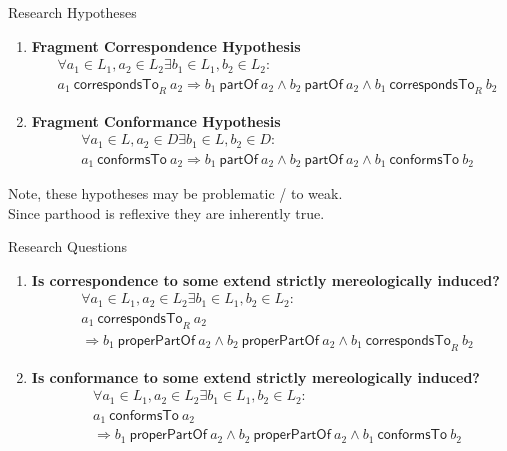 \documentclass{beamer}
\newcommand{\partOf}{~\textsf{partOf}~}
\newcommand{\properPartOf}{~\textsf{properPartOf}~}
\newcommand{\correspondsToR}[1]{~\textsf{correspondsTo}_{#1}~}
\newcommand{\conformsTo}{~\textsf{conformsTo}~}
\begin{document}
\begin{frame}{Research Hypotheses}
\begin{enumerate}[RH1]
\item
\textbf{Fragment Correspondence Hypothesis}
{\scriptsize
\begin{align*}
&\forall a_1 \in L_1, a_2 \in L_2 \exists b_1 \in L_1, b_2 \in L_2 :  
\\&a_1 \correspondsToR{R} a_2
\Rightarrow 
b_1 \partOf a_2 
\wedge b_2 \partOf a_2
\wedge b_1 \correspondsToR{R} b_2
\end{align*}
}
\item
\textbf{Fragment Conformance Hypothesis}
{\scriptsize
\begin{align*}
&\forall a_1 \in L, a_2 \in D \exists b_1 \in L, b_2 \in D : 
\\&a_1 \conformsTo a_2
\Rightarrow 
b_1 \partOf a_2
\wedge b_2 \partOf a_2
\wedge b_1 \conformsTo b_2
\end{align*}
}
\end{enumerate}
\begin{center}
\tiny
Note, these hypotheses may be problematic / to weak.
\\Since parthood is reflexive they are inherently true.
\end{center}
\end{frame}

\begin{frame}{Research Questions}
\begin{enumerate}[RQ1]

\item
\textbf{Is correspondence to some extend strictly mereologically induced?}
{\scriptsize
\begin{align*}
&\forall a_1 \in L_1, a_2 \in L_2 \exists b_1 \in L_1, b_2 \in L_2 :
\\&a_1 \correspondsToR{R} a_2
\\&\Rightarrow 
b_1 \properPartOf a_2 
\wedge b_2 \properPartOf a_2 
\wedge b_1 \correspondsToR{R} b_2
\end{align*}
}

\item
\textbf{Is conformance to some extend strictly mereologically induced?}
{\scriptsize
\begin{align*}
&\forall a_1 \in L_1, a_2 \in L_2 \exists b_1 \in L_1, b_2 \in L_2 :
\\&a_1 \conformsTo a_2
\\&\Rightarrow 
b_1 \properPartOf a_2 
\wedge b_2 \properPartOf a_2 
\wedge b_1 \conformsTo b_2
\end{align*}
}

\end{enumerate}
\end{frame}
\end{document}
